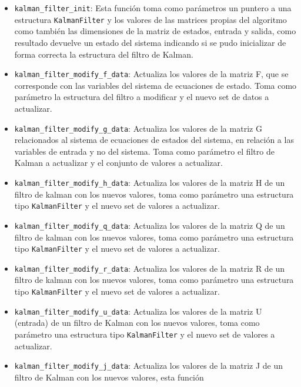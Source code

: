 \documentclass[10pt, a4paper]{article}
\begin{document}
\begin{itemize}
    \item \texttt{kalman\_filter\_init}: Esta funci\'on toma como par\'ametros un
        puntero a una estructura \texttt{KalmanFilter} y los valores de las
        matrices propias del algoritmo como tambi\'en las dimensiones de la
        matriz de estados, entrada y salida, como resultado devuelve un estado
        del sistema indicando si se pudo inicializar de forma correcta la
        estructura del filtro de Kalman.
    \item \texttt{kalman\_filter\_modify\_f\_data}: Actualiza los valores de la
        matriz F, que se corresponde con las variables del sistema de ecuaciones
        de estado. Toma como par\'ametro la estructura del filtro a modificar y
        el nuevo set de datos a actualizar.
    \item \texttt{kalman\_filter\_modify\_g\_data}: Actualiza los valores de la
        matriz G relacionados al sistema de ecuaciones de estados del sistema,
        en relaci\'on a las variables de entrada y no del sistema. Toma como
        par\'ametro el filtro de Kalman a actualizar y el conjunto de valores a
        actualizar.
    \item \texttt{kalman\_filter\_modify\_h\_data}: Actualiza los valores de la
        matriz H de un filtro de kalman con los nuevos valores, toma como
        par\'ametro una estructura tipo \texttt{KalmanFilter} y el nuevo set de
        valores a actualizar.
    \item \texttt{kalman\_filter\_modify\_q\_data}: Actualiza los valores de la
        matriz Q de un filtro de kalman con los nuevos valores, toma como
        par\'ametro una estructura tipo \texttt{KalmanFilter} y el nuevo set de
        valores a actualizar.
    \newpage
    \item \texttt{kalman\_filter\_modify\_r\_data}: Actualiza los valores de la
        matriz R de un filtro de kalman con los nuevos valores, toma como
        par\'ametro una estructura tipo \texttt{KalmanFilter} y el nuevo set de
        valores a actualizar.
    \item \texttt{kalman\_filter\_modify\_u\_data}: Actualiza los valores de la
        matriz U (entrada) de un filtro de Kalman con los nuevos valores, toma 
        como par\'ametro una estructura tipo \texttt{KalmanFilter} y el nuevo 
        set de valores a actualizar.
    \item \texttt{kalman\_filter\_modify\_j\_data}: Actualiza los valores de la
        matriz J de un filtro de Kalman con los nuevos valores, esta funci\'on

\end{itemize}
\end{document}

